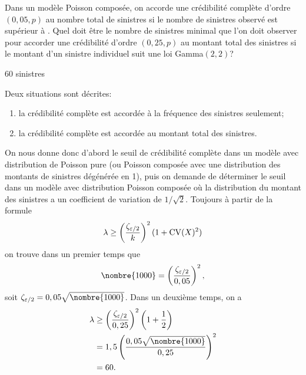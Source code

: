 \begin{exercice}
  Dans un modèle Poisson composée, on accorde une crédibilité complète
  d'ordre $(0,05, p)$ au nombre total de sinistres si le nombre de
  sinistres observé est supérieur à . Quel doit être le
  nombre de sinistres minimal que l'on doit observer pour accorder une
  crédibilité d'ordre $(0,25, p)$ au montant total des sinistres si le
  montant d'un sinistre individuel suit une loi Gamma$(2, 2)$?
  \begin{rep}
    60 sinistres
  \end{rep}
  \begin{sol}
    Deux situations sont décrites:
    \begin{enumerate}[1)]
    \item la crédibilité complète est accordée à la fréquence des
      sinistres seulement;
    \item la crédibilité complète est accordée au montant total des
      sinistres.
    \end{enumerate}
    On nous donne donc d'abord le seuil de crédibilité complète dans
    un modèle avec distribution de Poisson pure (ou Poisson composée
    avec une distribution des montants de sinistres dégénérée en 1),
    puis on demande de déterminer le seuil dans un modèle avec
    distribution Poisson composée où la distribution du montant des
    sinistres a un coefficient de variation de $1/\sqrt{2}$. Toujours
    à partir de la formule
    \begin{displaymath}
      \lambda \geq
      \left(
        \frac{\zeta_{\varepsilon/2}}{k}
      \right)^2
      (1 + \operatorname{CV}(X)^2)
    \end{displaymath}
    on trouve dans un premier temps que
    \begin{displaymath}
      \nombre{1000} =
      \left(
        \frac{\zeta_{\varepsilon/2}}{0,05}
      \right)^2,
    \end{displaymath}
    soit $\zeta_{\varepsilon/2} = 0,05 \sqrt{\nombre{1000}}$. Dans un
    deuxième temps, on a
    \begin{align*}
      \lambda
      &\geq
      \left(
        \frac{\zeta_{\varepsilon/2}}{0,25}
      \right)^2
      \left(
        1 + \frac{1}{2}
      \right) \\
      &= 1,5
      \left(
        \frac{0,05 \sqrt{\nombre{1000}}}{0,25}
      \right)^2 \\
      &= 60.
    \end{align*}
  \end{sol}
\end{exercice}

